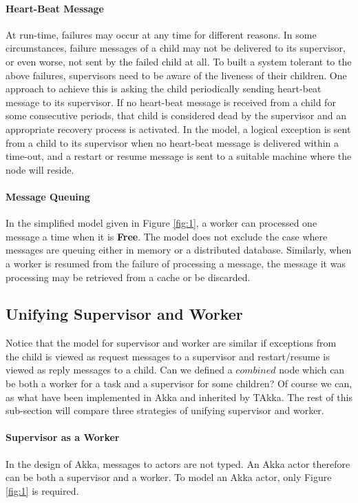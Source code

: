 \documentclass[12pt, authoryear]{article}
\begin{document}
\paragraph{Heart-Beat Message}  At run-time, failures may occur at any time for 
different reasons.  In some circumstances, failure messages of a child may not 
be delivered to its supervisor, or even worse, not sent by the failed child at 
all.  To built a system tolerant to the above failures, supervisors need to be 
aware of the liveness of their children.  One approach to achieve this is 
asking the child periodically sending heart-beat message to its supervisor.  
If no heart-beat message is received from a child for some consecutive 
periods, that child is considered dead by the supervisor and an appropriate 
recovery process is activated.  In the model, a 
logical exception is sent from a child to its supervisor when no heart-beat 
message is delivered within a time-out, and a restart or resume message is sent 
to a suitable machine where the node will reside.


\paragraph{Message Queuing}
In the simplified model given in Figure \ref{fig:1}, a worker can processed one 
message a time when it is {\bf Free}.  The model does not exclude the case 
where messages are queuing either in memory or a distributed database.  
Similarly, when a worker is resumed from the failure of processing a message, 
the message it was processing may be retrieved from a cache or be discarded.




\subsection{Unifying Supervisor and Worker}

Notice that the model for supervisor and worker are similar if exceptions from 
the child is viewed as request messages to a supervisor and restart/resume 
is viewed as reply messages to a child.  Can we defined a $combined$ node which 
can be both a worker for a task and a supervisor for some children? Of course 
we can, as what have been implemented in Akka\citep{akka_doc} and inherited by 
TAkka. The rest of this sub-section will compare three strategies of unifying 
supervisor and worker.

\paragraph{Supervisor as a Worker}  In the design of Akka, messages to 
actors are not typed.  An Akka actor therefore can be both a supervisor and a 
worker.  To model an Akka actor, only Figure \ref{fig:1} is required.
\end{document}
